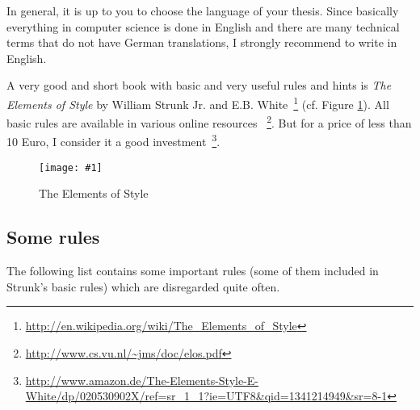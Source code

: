 \documentclass{article}
\newcommand{\img}[4]{
	\begin{figure}[!htb]
		\centering
		\texttt{[image: \#1]}
		\caption{#3}
		\label{#2}
	\end{figure}
}
\begin{document}
In general, it is up to you to choose the language of your thesis.
Since basically everything in computer science is done in English and there are many technical terms that do not have German translations, I strongly recommend to write in English.

A very good and short book with basic and very useful rules and hints is \emph{The Elements of Style} by William Strunk Jr. and E.B. White~\footnote{\url{http://en.wikipedia.org/wiki/The_Elements_of_Style}} (cf. Figure \ref{fig:elements}).
All basic rules are available in various online resources~
\footnote{\url{http://www.cs.vu.nl/~jms/doc/elos.pdf}}.
But for a price of less than 10 Euro, I consider it a good investment~\footnote{\url{http://www.amazon.de/The-Elements-Style-E-White/dp/020530902X/ref=sr_1_1?ie=UTF8&qid=1341214949&sr=8-1}}.

\img{elements-of-style}{fig:elements}{The Elements of Style}{0.2}

\subsection{Some rules}

The following list contains some important rules (some of them included in Strunk's basic rules) which are disregarded quite often.
\end{document}
